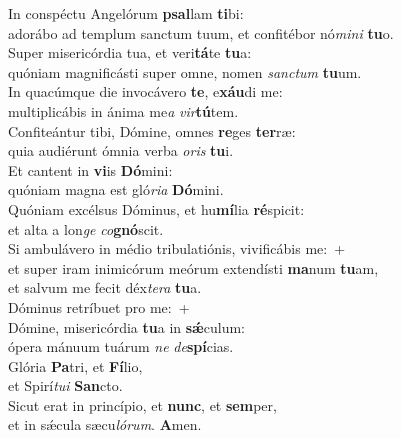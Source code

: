 \evenverse In conspéctu Angelórum \textbf{psal}lam \textbf{ti}bi:~\*\\
\evenverse adorábo ad templum sanctum tuum, et confitébor nó\textit{mi}\textit{ni} \textbf{tu}o.\\
\oddverse Super misericórdia tua, et veri\textbf{tá}te \textbf{tu}a:~\*\\
\oddverse quóniam magnificásti super omne, nomen \textit{san}\textit{ctum} \textbf{tu}um.\\
\evenverse In quacúmque die invocávero \textbf{te}, e\textbf{xáu}di me:~\*\\
\evenverse multiplicábis in ánima me\textit{a} \textit{vir}\textbf{tú}tem.\\
\oddverse Confiteántur tibi, Dómine, omnes \textbf{re}ges \textbf{ter}ræ:~\*\\
\oddverse quia audiérunt ómnia verba \textit{o}\textit{ris} \textbf{tu}i.\\
\evenverse Et cantent in \textbf{vi}is \textbf{Dó}mini:~\*\\
\evenverse quóniam magna est gló\textit{ri}\textit{a} \textbf{Dó}mini.\\
\oddverse Quóniam excélsus Dóminus, et hu\textbf{mí}lia \textbf{ré}spicit:~\*\\
\oddverse et alta a lon\textit{ge} \textit{co}\textbf{gnó}scit.\\
\evenverse Si ambulávero in médio tribulatiónis, vivificábis me:~+\\
\evenverse  et super iram inimicórum meórum extendísti \textbf{ma}num \textbf{tu}am,~\*\\
\evenverse et salvum me fecit déx\textit{te}\textit{ra} \textbf{tu}a.\\
\oddverse Dóminus retríbuet pro me:~+\\
\oddverse  Dómine, misericórdia \textbf{tu}a in \textbf{sǽ}culum:~\*\\
\oddverse ópera mánuum tuárum \textit{ne} \textit{de}\textbf{spí}cias.\\
\evenverse Glória \textbf{Pa}tri, et \textbf{Fí}lio,~\*\\
\evenverse et Spirí\textit{tu}\textit{i} \textbf{San}cto.\\
\oddverse Sicut erat in princípio, et \textbf{nunc}, et \textbf{sem}per,~\*\\
\oddverse et in sǽcula sæcu\textit{ló}\textit{rum}. \textbf{A}men.\\
